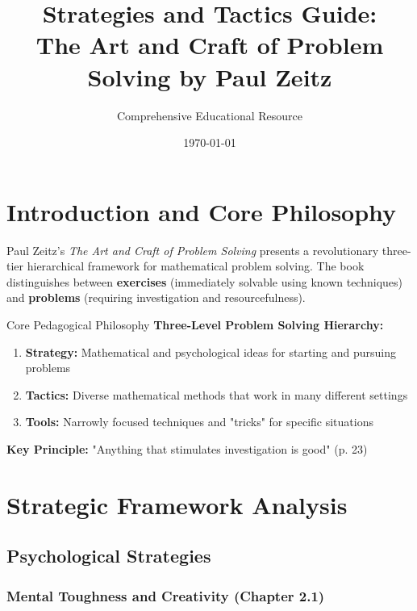 \documentclass[12pt]{article}
\title{\textbf{Strategies and Tactics Guide:\\The Art and Craft of Problem Solving by Paul Zeitz}}
\author{Comprehensive Educational Resource}
\date{\today \space \docversion}
\begin{document}
	
	\maketitle
	
	\tableofcontents
	\newpage
	
	\section{Introduction and Core Philosophy}
	
	Paul Zeitz's \textit{The Art and Craft of Problem Solving} presents a revolutionary three-tier hierarchical framework for mathematical problem solving. The book distinguishes between \textbf{exercises} (immediately solvable using known techniques) and \textbf{problems} (requiring investigation and resourcefulness).
	
	\begin{strategybox}{Core Pedagogical Philosophy}
		\textbf{Three-Level Problem Solving Hierarchy:}
		\begin{enumerate}
			\item \textbf{Strategy:} Mathematical and psychological ideas for starting and pursuing problems
			\item \textbf{Tactics:} Diverse mathematical methods that work in many different settings
			\item \textbf{Tools:} Narrowly focused techniques and "tricks" for specific situations
		\end{enumerate}
		
		\textbf{Key Principle:} "Anything that stimulates investigation is good" (p. 23)
	\end{strategybox}
	
	\section{Strategic Framework Analysis}
	
	\subsection{Psychological Strategies}
	
	\subsubsection{Mental Toughness and Creativity (Chapter 2.1)}
	
\end{document}
